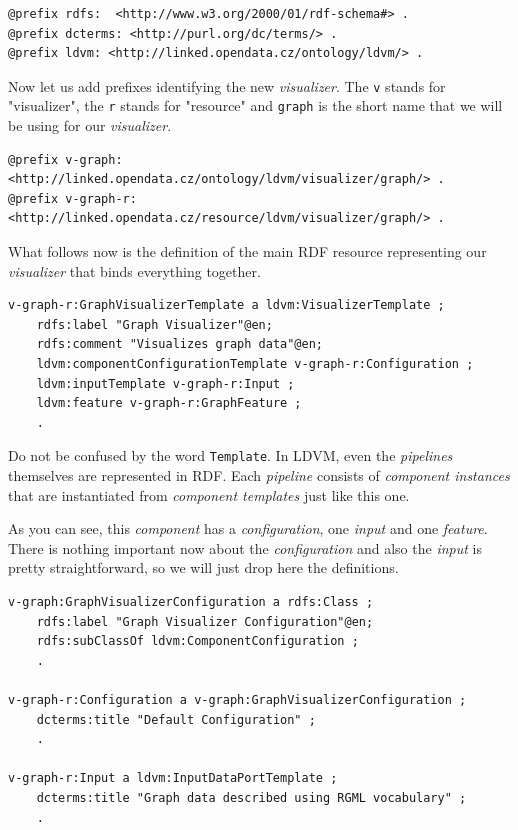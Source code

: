 \scriptsize
\begin{verbatim}
@prefix rdfs:  <http://www.w3.org/2000/01/rdf-schema#> .
@prefix dcterms: <http://purl.org/dc/terms/> .
@prefix ldvm: <http://linked.opendata.cz/ontology/ldvm/> .
\end{verbatim}
\normalsize

Now let us add prefixes identifying the new \emph{visualizer}. The \texttt{v} stands for "visualizer", the \texttt{r} stands for "resource" and \texttt{graph} is the short name that we will be using for our \emph{visualizer}.

\scriptsize
\begin{verbatim}
@prefix v-graph: <http://linked.opendata.cz/ontology/ldvm/visualizer/graph/> .
@prefix v-graph-r: <http://linked.opendata.cz/resource/ldvm/visualizer/graph/> .
\end{verbatim}
\normalsize

What follows now is the definition of the main RDF resource representing our \emph{visualizer} that binds everything together.

\scriptsize
\begin{verbatim}
v-graph-r:GraphVisualizerTemplate a ldvm:VisualizerTemplate ;
    rdfs:label "Graph Visualizer"@en;
    rdfs:comment "Visualizes graph data"@en;
    ldvm:componentConfigurationTemplate v-graph-r:Configuration ;
    ldvm:inputTemplate v-graph-r:Input ;
    ldvm:feature v-graph-r:GraphFeature ;
    .
\end{verbatim}
\normalsize

Do not be confused by the word \texttt{Template}. In LDVM, even the \emph{pipelines} themselves are represented in RDF. Each \emph{pipeline} consists of \emph{component instances} that are instantiated from \emph{component templates} just like this one.

As you can see, this \emph{component} has a \emph{configuration}, one \emph{input} and one \emph{feature}. There is nothing important now about the \emph{configuration} and also the \emph{input} is pretty straightforward, so we will just drop here the definitions.

\scriptsize
\begin{verbatim}
v-graph:GraphVisualizerConfiguration a rdfs:Class ;
    rdfs:label "Graph Visualizer Configuration"@en;
    rdfs:subClassOf ldvm:ComponentConfiguration ;
    .
  
v-graph-r:Configuration a v-graph:GraphVisualizerConfiguration ;
    dcterms:title "Default Configuration" ;
    .

v-graph-r:Input a ldvm:InputDataPortTemplate ;
    dcterms:title "Graph data described using RGML vocabulary" ;
    .
\end{verbatim}
\normalsize

